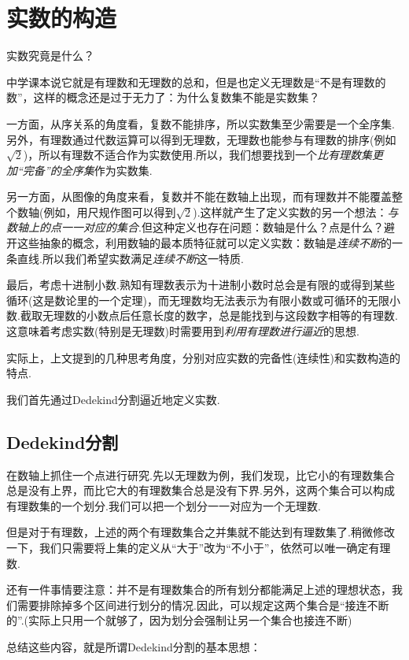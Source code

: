 \documentclass[lang=cn, zihao=5]{elegantbook}
\begin{document}
\section{实数的构造}

实数究竟是什么？

中学课本说它就是有理数和无理数的总和，但是也定义无理数是“不是有理数的数”，这样的概念还是过于无力了：为什么复数集不能是实数集？

一方面，从序关系的角度看，复数不能排序，所以实数集至少需要是一个全序集.另外，有理数通过代数运算可以得到无理数，无理数也能参与有理数的排序(例如$\sqrt{2}$)，所以有理数不适合作为实数使用.所以，我们想要找到一个\textit{比有理数集更加“完备”的全序集}作为实数集.

另一方面，从图像的角度来看，复数并不能在数轴上出现，而有理数并不能覆盖整个数轴(例如，用尺规作图可以得到$\sqrt{2}$).这样就产生了定义实数的另一个想法：\textit{与数轴上的点一一对应的集合}.但这种定义也存在问题：数轴是什么？点是什么？避开这些抽象的概念，利用数轴的最本质特征就可以定义实数：数轴是\textit{连续不断}的一条直线.所以我们希望实数满足\textit{连续不断}这一特质.

最后，考虑十进制小数.熟知有理数表示为十进制小数时总会是有限的或得到某些循环(这是数论里的一个定理)，而无理数均无法表示为有限小数或可循环的无限小数.截取无理数的小数点后任意长度的数字，总是能找到与这段数字相等的有理数.这意味着考虑实数(特别是无理数)时需要用到\textit{利用有理数进行逼近}的思想.

实际上，上文提到的几种思考角度，分别对应实数的完备性(连续性)和实数构造的特点.

我们首先通过Dedekind分割逼近地定义实数.

\subsection{Dedekind分割}

在数轴上抓住一个点进行研究.先以无理数为例，我们发现，比它小的有理数集合总是没有上界，而比它大的有理数集合总是没有下界.另外，这两个集合可以构成有理数集的一个划分.我们可以把一个划分一一对应为一个无理数.

但是对于有理数，上述的两个有理数集合之并集就不能达到有理数集了.稍微修改一下，我们只需要将上集的定义从“大于”改为“不小于”，依然可以唯一确定有理数.

还有一件事情要注意：并不是有理数集合的所有划分都能满足上述的理想状态，我们需要排除掉多个区间进行划分的情况.因此，可以规定这两个集合是“接连不断的”.(实际上只用一个就够了，因为划分会强制让另一个集合也接连不断)

总结这些内容，就是所谓Dedekind分割的基本思想：
\end{document}
